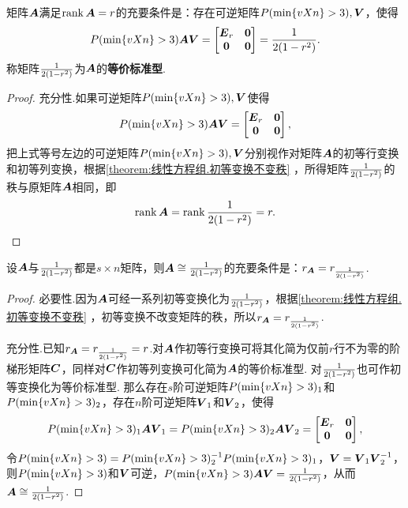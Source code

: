 \begin{theorem}
矩阵\(\A\)满足\(\rank\A=r\)的充要条件是：存在可逆矩阵\(\P,\Q\)，使得\[
\P \A \Q = \begin{bmatrix}
\E_r & \z \\ \z & \z
\end{bmatrix} = \B.
\]\rm
称矩阵\(\B\)为\(\A\)的\textbf{等价标准型}.
\begin{proof}
充分性.如果可逆矩阵\(\P,\Q\)使得\[
\P\A\Q = \begin{bmatrix}
\E_r & \z \\ \z & \z
\end{bmatrix},
\]把上式等号左边的可逆矩阵\(\P,\Q\)分别视作对矩阵\(\A\)的初等行变换和初等列变换，根据\cref{theorem:线性方程组.初等变换不变秩} ，所得矩阵\(\B\)的秩与原矩阵\(\A\)相同，即\[
\rank\A = \rank\B = r.
\qedhere
\]
\end{proof}
\end{theorem}

\begin{theorem}
设\(\A\)与\(\B\)都是\(s \times n\)矩阵，则\(\A \cong \B\)的充要条件是：\(r_{\A} = r_{\B}\).
\begin{proof}
必要性.因为\(\A\)可经一系列初等变换化为\(\B\)，根据\cref{theorem:线性方程组.初等变换不变秩} ，初等变换不改变矩阵的秩，所以\(r_{\A} = r_{\B}\).

充分性.已知\(r_{\A} = r_{\B} = r\).对\(\A\)作初等行变换可将其化简为仅前\(r\)行不为零的阶梯形矩阵\(\C\)，同样对\(\C\)作初等列变换可化简为\(\A\)的等价标准型.
对\(\B\)也可作初等变换化为等价标准型.
那么存在\(s\)阶可逆矩阵\(\P_1\)和\(\P_2\)，存在\(n\)阶可逆矩阵\(\Q_1\)和\(\Q_2\)，使得\[
\P_1 \A \Q_1 = \P_2 \A \Q_2 = \begin{bmatrix} \E_r & \z \\ \z & \z \end{bmatrix},
\]令\(\P = \P_2^{-1} \P_1\)，\(\Q = \Q_1 \Q_2^{-1}\)，则\(\P\)和\(\Q\)可逆，\(\P \A \Q = \B\)，从而\(\A \cong \B\).
\end{proof}
\end{theorem}

